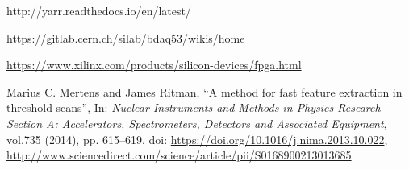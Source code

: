 \begin{thebibliography}{1}
 http://yarr.readthedocs.io/en/latest/

 https://gitlab.cern.ch/silab/bdaq53/wikis/home

 \url{https://www.xilinx.com/products/silicon-devices/fpga.html}

 Marius C. Mertens and James Ritman, ``A method for fast feature extraction in threshold scans'', 
In: \textit{Nuclear Instruments and Methods in Physics Research Section A: Accelerators, Spectrometers, Detectors and Associated Equipment}, 
vol.735 (2014), pp. 615--619, doi: \url{https://doi.org/10.1016/j.nima.2013.10.022}, 
	\url{http://www.sciencedirect.com/science/article/pii/S0168900213013685}.


\end{thebibliography}
